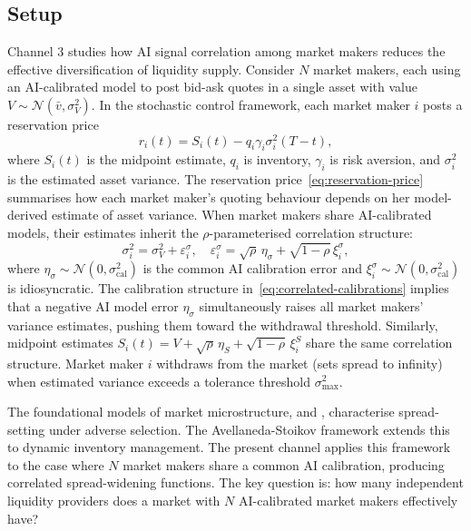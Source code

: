 \label{sec:channel3}

\subsection{Setup}

Channel 3 studies how AI signal correlation among market makers reduces the effective diversification of liquidity supply. Consider $N$ market makers, each using an AI-calibrated model to post bid-ask quotes in a single asset with value $V \sim \mathcal{N}(\bar{v}, \sigma_V^2)$. In the \citet{avellaneda2008} stochastic control framework, each market maker $i$ posts a reservation price
\begin{equation}\label{eq:reservation-price}
  r_i(t) = S_i(t) - q_i\gamma_i\sigma_i^2(T-t),
\end{equation}
where $S_i(t)$ is the midpoint estimate, $q_i$ is inventory, $\gamma_i$ is risk aversion, and $\sigma_i^2$ is the estimated asset variance. The reservation price~\eqref{eq:reservation-price} summarises how each market maker's quoting behaviour depends on her model-derived estimate of asset variance. When market makers share AI-calibrated models, their estimates inherit the $\rho$-parameterised correlation structure:
\begin{equation}\label{eq:correlated-calibrations}
  \sigma_i^2 = \sigma_V^2 + \varepsilon_i^\sigma, \quad \varepsilon_i^\sigma = \sqrt{\rho}\,\eta_\sigma + \sqrt{1-\rho}\,\xi_i^\sigma,
\end{equation}
where $\eta_\sigma \sim \mathcal{N}(0,\sigma_{\text{cal}}^2)$ is the common AI calibration error and $\xi_i^\sigma \sim \mathcal{N}(0,\sigma_{\text{cal}}^2)$ is idiosyncratic. The calibration structure in~\eqref{eq:correlated-calibrations} implies that a negative AI model error $\eta_\sigma$ simultaneously raises all market makers' variance estimates, pushing them toward the withdrawal threshold. Similarly, midpoint estimates $S_i(t) = V + \sqrt{\rho}\,\eta_S + \sqrt{1-\rho}\,\xi_i^S$ share the same correlation structure. Market maker $i$ withdraws from the market (sets spread to infinity) when estimated variance exceeds a tolerance threshold $\sigma_{\max}^2$.

The foundational models of market microstructure, \citet{glosten1985} and \citet{kyle1985}, characterise spread-setting under adverse selection. The Avellaneda-Stoikov framework extends this to dynamic inventory management. The present channel applies this framework to the case where $N$ market makers share a common AI calibration, producing correlated spread-widening functions. The key question is: how many independent liquidity providers does a market with $N$ AI-calibrated market makers effectively have?

